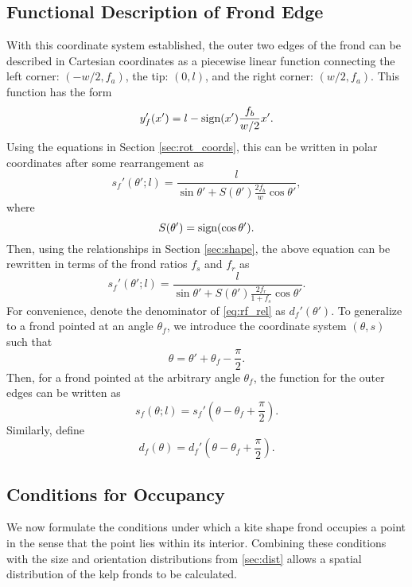 \subsection{Functional Description of Frond Edge}
With this coordinate system established, the outer two edges of the frond can be described in Cartesian coordinates as a piecewise linear function connecting the left corner: $(-w/2,f_a)$, the tip: $(0,l)$, and the right corner: $(w/2,f_a)$.
This function has the form
\begin{equation*}
	y'_f(x') = l-\mbox{sign}(x')\frac{f_b}{w/2}x'.
\end{equation*}
Using the equations in Section \ref{sec:rot_coords}, this can be written in polar coordinates after some rearrangement as
\begin{equation*}
	s_f'(\theta';l) = \frac{l}{\sin\theta' + S(\theta')\frac{2f_b}{w}\cos\theta'},
\end{equation*}
where
\begin{equation*}
	S(\theta') = \mbox{sign}(\cos\theta').
\end{equation*}
Then, using the relationships in Section \ref{sec:shape}, the above equation can be rewritten in terms of the frond ratios $f_s$ and $f_r$ as
\begin{equation}
	\label{eq:rf_rel}
	s_f'(\theta';l) = \frac{l}{\sin\theta' + S(\theta')\frac{2f_r}{1+f_s}\cos\theta'}.
\end{equation}
For convenience, denote the denominator of \eqref{eq:rf_rel} as $d_f'(\theta')$.
To generalize to a frond pointed at an angle $\theta_f$, we introduce the coordinate system $(\theta,s)$ such that
\begin{equation*}
	\theta = \theta' + \theta_f - \frac{\pi}{2}.
\end{equation*}
Then, for a frond pointed at the arbitrary angle $\theta_f$, the function for the outer edges can be written as
\begin{equation}
	\label{eq:rf_abs}
	s_f(\theta;l) = s_f'\left(\theta - \theta_f + \frac{\pi}{2} \right).
\end{equation}
Similarly, define
\begin{equation}
	d_f(\theta) = d_f'\left(\theta - \theta_f + \frac{\pi}{2} \right).
\end{equation}

\subsection{Conditions for Occupancy}
We now formulate the conditions under which a kite shape frond occupies a point
in the sense that the point lies within its interior.
Combining these conditions with the size and orientation distributions from \ref{sec:dist}
allows a spatial distribution of the kelp fronds to be calculated.

